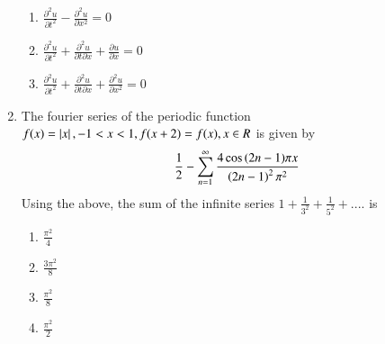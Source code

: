 \documentclass[journal]{IEEEtran}
\begin{document}
\begin{enumerate}[start=1]
\begin{multicols}{2}
\begin{enumerate}
        \item $\frac{\partial^2 u}{\partial t^2}-\frac{\partial^2 u}{\partial x^2}=0$
        
        \item $\frac{\partial^2 u}{\partial t^2}+\frac{\partial^2 u}{\partial t \partial x}+\frac{\partial u}{\partial x}=0$
        
         \item $\frac{\partial^2 u}{\partial t^2}+\frac{\partial^2 u}{\partial t \partial x}+\frac{\partial^2 u}{\partial x^2}=0$
    \end{enumerate}
\end{multicols}
\item The fourier series of the periodic function \\
$f(x)=\left\vert x\right\vert,-1<x<1, f(x+2)=f(x),x\in R$   is given by\\
\[
 \frac{1}{2}-\sum_{n=1}^{\infty} \frac{4\cos{\ensuremath{\left(2n-1\right)}}\pi x}{\left(2n-1\right)^2 \pi^2}
\]
Using the above, the sum of the infinite series $1+\frac{1}{3^2}+\frac{1}{5^2}+....$ is
\begin{multicols}{4}
\begin{enumerate}
    \item $\frac{\pi^2}{4}$
    \item $\frac{3\pi^2}{8}$
    \item $\frac{\pi^2}{8}$
    \item $\frac{\pi^2}{2}$
\end{enumerate}
\end{multicols}
\end{enumerate}
\end{document}
